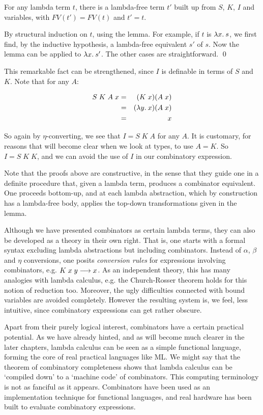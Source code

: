 \begin{theorem}
For any lambda term $t$, there is a lambda-free term $t'$ built up from $S$,
$K$, $I$ and variables, with $FV(t') = FV(t)$ and $t' = t$.

\proof By structural induction on $t$, using the lemma. For example, if $t$ is
$\lambda x.\: s$, we first find, by the inductive hypothesis, a lambda-free
equivalent $s'$ of $s$. Now the lemma can be applied to $\lambda x.\: s'$. The
other cases are straightforward. \qed

\end{theorem}

This remarkable fact can be strengthened, since $I$ is definable in terms of
$S$ and $K$. Note that for any $A$:

\begin{eqnarray*}
S\;K\;A\;x & = & (K\; x) (A\; x)                \\
           & = & (\lambda y.\: x) (A\; x)           \\
           & = & x
\end{eqnarray*}

So again by $\eta$-converting, we see that $I = S\;K\;A$ for any $A$. It is
customary, for reasons that will become clear when we look at types, to use $A
= K$. So $I = S\;K\;K$, and we can avoid the use of $I$ in our combinatory
expression.

Note that the proofs above are constructive, in the sense that they guide one
in a definite procedure that, given a lambda term, produces a combinator
equivalent. One proceeds bottom-up, and at each lambda abstraction, which by
construction has a lambda-free body, applies the top-down transformations given
in the lemma.

Although we have presented combinators as certain lambda terms, they can also
be developed as a theory in their own right. That is, one starts with a formal
syntax excluding lambda abstractions but including combinators. Instead of
$\alpha$, $\beta$ and $\eta$ conversions, one posits {\em conversion rules} for
expressions involving combinators, e.g. $K\; x\; y \longrightarrow x$. As an
independent theory, this has many analogies with lambda calculus, e.g. the
Church-Rosser theorem holds for this notion of reduction too. Moreover, the
ugly difficulties connected with bound variables are avoided completely.
However the resulting system is, we feel, less intuitive, since combinatory
expressions can get rather obscure.

Apart from their purely logical interest, combinators have a certain practical
potential. As we have already hinted, and as will become much clearer in the
later chapters, lambda calculus can be seen as a simple functional language,
forming the core of real practical languages like ML. We might say that the
theorem of combinatory completeness shows that lambda calculus can be `compiled
down' to a `machine code' of combinators. This computing terminology is not as
fanciful as it appears. Combinators have been used as an implementation
technique for functional languages, and real hardware has been built to
evaluate combinatory expressions.

